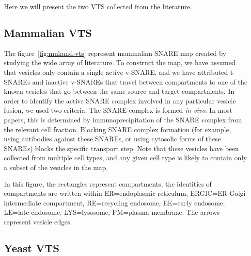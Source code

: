Here we will present the two VTS collected from the literature.

\subsection{Mammalian VTS}


The figure~\ref{fig:mukund-vts} represent mammalian SNARE map
created by studying the wide array of literature.
% 
To construct the map, we have assumed that vesicles only contain a
single active v-SNARE, and we have attributed t-SNAREs and inactive
v-SNAREs that travel between compartments to one of the known vesicles
that go between the same source and target compartments.
%
In order to identify the active SNARE complex involved in any
particular vesicle fusion, we used two criteria.
%
The SNARE complex is formed \textit{in vivo}. In most papers, this is
determined by immunoprecipitation of the SNARE complex from the
relevant cell fraction.
%
Blocking SNARE complex formation (for example, using antibodies
against these SNAREs, or using cytosolic forms of these SNAREs) blocks
the specific transport step.
%
Note that these vesicles have been collected from multiple cell types, and
any given cell type is likely to contain only a subset of the vesicles in
the map.

In this figure, the rectangles represent compartments, the identities
of compartments are written within ER=endoplasmic reticulum,
ERGIC=ER-Golgi intermediate compartment, RE=recycling endosome,
EE=early endosome, LE=late endosome, LYS=lysosome, PM=plasma
membrane. The arrows represent vesicle edges.




\subsection{Yeast VTS}

